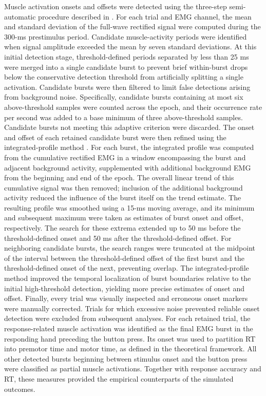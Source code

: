 \documentclass[a4paper,11pt]{article}
\theoremstyle{definition}
\newcommand{\1}{\mathbbm{1}}
\begin{document}
Muscle activation onsets and offsets were detected using the three-step semi-automatic procedure described in \textcite{achardExtendingContinuousFlow2025}. For each trial and EMG channel, the mean and standard deviation of the full-wave rectified signal were computed during the 300-ms prestimulus period. Candidate muscle-activity periods were identified when signal amplitude exceeded the mean by seven standard deviations. At this initial detection stage, threshold-defined periods separated by less than 25 ms were merged into a single candidate burst to prevent brief within-burst drops below the conservative detection threshold from artificially splitting a single activation. Candidate bursts were then filtered to limit false detections arising from background noise. Specifically, candidate bursts containing at most six above-threshold samples were counted across the epoch, and their occurrence rate per second was added to a base minimum of three above-threshold samples. Candidate bursts not meeting this adaptive criterion were discarded. The onset and offset of each retained candidate burst were then refined using the integrated-profile method \parencites{liuUseIntegratedProfile2016}{santelloControlTimingAmplitude1998}. For each burst, the integrated profile was computed from the cumulative rectified EMG in a window encompassing the burst and adjacent background activity, supplemented with additional background EMG from the beginning and end of the epoch. The overall linear trend of this cumulative signal was then removed; inclusion of the additional background activity reduced the influence of the burst itself on the trend estimate. The resulting profile was smoothed using a 15-ms moving average, and its minimum and subsequent maximum were taken as estimates of burst onset and offset, respectively. The search for these extrema extended up to 50 ms before the threshold-defined onset and 50 ms after the threshold-defined offset. For neighboring candidate bursts, the search ranges were truncated at the midpoint of the interval between the threshold-defined offset of the first burst and the threshold-defined onset of the next, preventing overlap. The integrated-profile method improved the temporal localization of burst boundaries relative to the initial high-threshold detection, yielding more precise estimates of onset and offset. Finally, every trial was visually inspected and erroneous onset markers were manually corrected. Trials for which excessive noise prevented reliable onset detection were excluded from subsequent analyses. For each retained trial, the response-related muscle activation was identified as the final EMG burst in the responding hand preceding the button press. Its onset was used to partition RT into premotor time and motor time, as defined in the theoretical framework. All other detected bursts beginning between stimulus onset and the button press were classified as partial muscle activations. Together with response accuracy and RT, these measures provided the empirical counterparts of the simulated outcomes.
\end{document}
